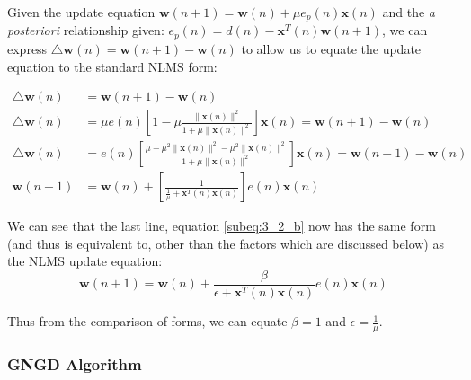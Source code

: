 \documentclass[./main.tex]{subfiles}
\begin{document}
Given the update equation $ \mathbf{w}(n+1) = \mathbf{w}(n) + \mu e_p(n) \mathbf{x}(n) $ and the \textit{a posteriori} relationship given: $  e_p(n) = d(n) - \mathbf{x}^T(n) \mathbf{w}(n+1) $, we can express $ \bigtriangleup \mathbf{w}(n) = \mathbf{w}(n+1) - \mathbf{w}(n) $ to allow us to equate the update equation to the standard NLMS form:

\begin{subequations}
	\begin{align}
	\bigtriangleup \mathbf{w}(n) &= \mathbf{w}(n+1) - \mathbf{w}(n) \\
	\bigtriangleup \mathbf{w}(n) &= \mu e(n) \left[  1 - \mu \frac{\lVert \mathbf{x}(n)\rVert^2}{1 + \mu \lVert \mathbf{x}(n)\rVert^2} \right] \mathbf{x}(n) = \mathbf{w}(n+1) - \mathbf{w}(n) \\
	\bigtriangleup \mathbf{w}(n) &= e(n) \left[ \frac{\mu + \mu^2  \lVert \mathbf{x}(n)\rVert^2 - \mu^2 \lVert \mathbf{x}(n)\rVert^2}{1 + \mu \lVert \mathbf{x}(n)\rVert^2} \right] \mathbf{x}(n) = \mathbf{w}(n+1) - \mathbf{w}(n) \\
	\mathbf{w}(n+1) &= \mathbf{w}(n) + \left[ \frac{1}{\frac{1}{\mu} + \mathbf{x}^T(n)\mathbf{x}(n) } \right] e(n) \mathbf{x}(n)  \label{subeq:3_2_b}
	\end{align}
\end{subequations}

We can see that the last line, equation \ref{subeq:3_2_b} now has the same form (and thus is equivalent to, other than the factors which are discussed below) as the NLMS update equation:
$$ \mathbf{w}(n+1) = \mathbf{w}(n) + \frac{\beta}{\epsilon + \mathbf{x}^T(n)\mathbf{x}(n)} e(n) \mathbf{x}(n) $$

Thus from the comparison of forms, we can equate $ \beta = 1 $ and $ \epsilon = \frac{1}{\mu} $.

\subsubsection{GNGD Algorithm}
\end{document}
